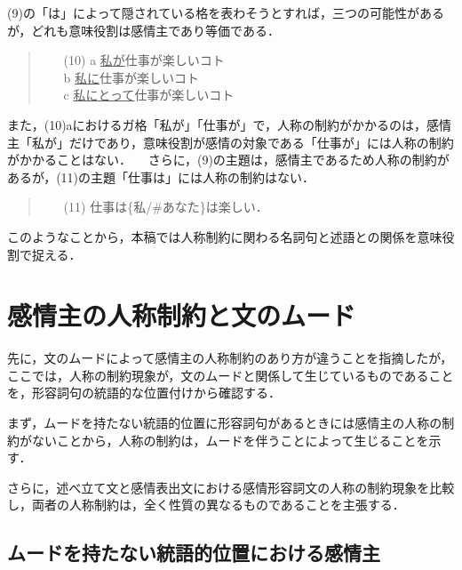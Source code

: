 (9)の「は」によって隠されている格を表わそうとすれば，三つの可能性がある
が，どれも意味役割は感情主であり等価である．

\vspace{0.3cm}
\begin{quote}
\begin{itemize}
 \item[(10)] a \underline{私が}仕事が楽しいコト\\
	     b \underline{私に}仕事が楽しいコト\\
	     c \underline{私にとって}仕事が楽しいコト
\end{itemize}
\end{quote}
\vspace{0.3cm}

また，(10)aにおけるガ格「私が」「仕事が」で，人称の制約がかかるのは，感情主「私が」だけであり，意味役割が感情の対象である「仕事が」には人称の制約がかかることはない．
　さらに，(9)の主題は，感情主であるため人称の制約があるが，(11)の主題「仕事は」には人称の制約はない．

\vspace{0.3cm}
\begin{quote}
\begin{itemize}
 \item[(11)] 仕事は\{私/\#あなた\}は楽しい．
\end{itemize}
\end{quote}
\vspace{0.3cm}

このようなことから，本稿では人称制約に関わる名詞句と述語との関係を意味役
割で捉える．

\section{感情主の人称制約と文のムード}

先に，文のムードによって感情主の人称制約のあり方が違うことを指摘したが，
ここでは，人称の制約現象が，文のムードと関係して生じているものであること
を，形容詞句の統語的な位置付けから確認する．

まず，ムードを持たない統語的位置に形容詞句があるときには感情主の人称の制
約がないことから，人称の制約は，ムードを伴うことによって生じることを示す．

さらに，述べ立て文と感情表出文における感情形容詞文の人称の制約現象を比較
し，両者の人称制約は，全く性質の異なるものであることを主張する．

\subsection{ムードを持たない統語的位置における感情主}

